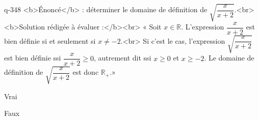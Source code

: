 \begin{truefalse}{q-348}
<b>Énoncé</b> : déterminer le domaine de définition de $\sqrt{\dfrac{x}{x+2}}$.<br> <b>Solution rédigée à évaluer :</b><br>  « Soit $x\in\mathbb{R}$. L'expression $\dfrac{x}{x+2}$ est bien définie si et seulement si $x\neq -2$.<br> Si c'est le cas, l'expression $\sqrt{\dfrac{x}{x+2}}$ est bien définie ssi $\dfrac{x}{x+2}\geq 0$, autrement dit ssi $x\geq 0$ et $x\geq -2$. Le domaine de définition de $\sqrt{\dfrac{x}{x+2}}$ est donc $\mathbb{R}_{+}$.»
\item Vrai
\item* Faux
\end{truefalse}


